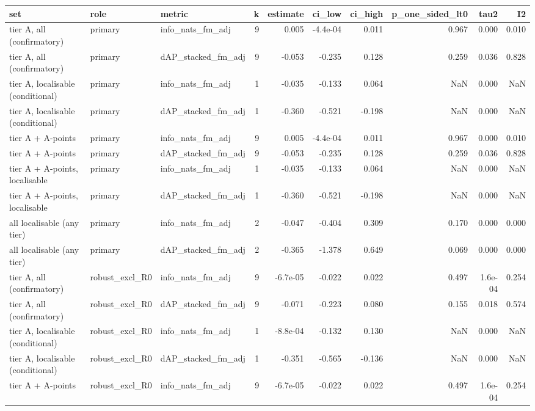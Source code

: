 \begin{tabular}{lllrrrrrrr}
\toprule
set & role & metric & k & estimate & ci_low & ci_high & p_one_sided_lt0 & tau2 & I2 \\
\midrule
tier A, all (confirmatory) & primary & info\_nats\_fm\_adj & 9 & 0.005 & -4.4e-04 & 0.011 & 0.967 & 0.000 & 0.010 \\
tier A, all (confirmatory) & primary & dAP\_stacked\_fm\_adj & 9 & -0.053 & -0.235 & 0.128 & 0.259 & 0.036 & 0.828 \\
tier A, localisable (conditional) & primary & info\_nats\_fm\_adj & 1 & -0.035 & -0.133 & 0.064 & NaN & 0.000 & NaN \\
tier A, localisable (conditional) & primary & dAP\_stacked\_fm\_adj & 1 & -0.360 & -0.521 & -0.198 & NaN & 0.000 & NaN \\
tier A + A-points & primary & info\_nats\_fm\_adj & 9 & 0.005 & -4.4e-04 & 0.011 & 0.967 & 0.000 & 0.010 \\
tier A + A-points & primary & dAP\_stacked\_fm\_adj & 9 & -0.053 & -0.235 & 0.128 & 0.259 & 0.036 & 0.828 \\
tier A + A-points, localisable & primary & info\_nats\_fm\_adj & 1 & -0.035 & -0.133 & 0.064 & NaN & 0.000 & NaN \\
tier A + A-points, localisable & primary & dAP\_stacked\_fm\_adj & 1 & -0.360 & -0.521 & -0.198 & NaN & 0.000 & NaN \\
all localisable (any tier) & primary & info\_nats\_fm\_adj & 2 & -0.047 & -0.404 & 0.309 & 0.170 & 0.000 & 0.000 \\
all localisable (any tier) & primary & dAP\_stacked\_fm\_adj & 2 & -0.365 & -1.378 & 0.649 & 0.069 & 0.000 & 0.000 \\
tier A, all (confirmatory) & robust\_excl\_R0 & info\_nats\_fm\_adj & 9 & -6.7e-05 & -0.022 & 0.022 & 0.497 & 1.6e-04 & 0.254 \\
tier A, all (confirmatory) & robust\_excl\_R0 & dAP\_stacked\_fm\_adj & 9 & -0.071 & -0.223 & 0.080 & 0.155 & 0.018 & 0.574 \\
tier A, localisable (conditional) & robust\_excl\_R0 & info\_nats\_fm\_adj & 1 & -8.8e-04 & -0.132 & 0.130 & NaN & 0.000 & NaN \\
tier A, localisable (conditional) & robust\_excl\_R0 & dAP\_stacked\_fm\_adj & 1 & -0.351 & -0.565 & -0.136 & NaN & 0.000 & NaN \\
tier A + A-points & robust\_excl\_R0 & info\_nats\_fm\_adj & 9 & -6.7e-05 & -0.022 & 0.022 & 0.497 & 1.6e-04 & 0.254 \\

\end{tabular}
